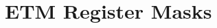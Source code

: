 \hypertarget{group___e_t_m___register___masks}{}\section{E\+T\+M Register Masks}
\label{group___e_t_m___register___masks}
